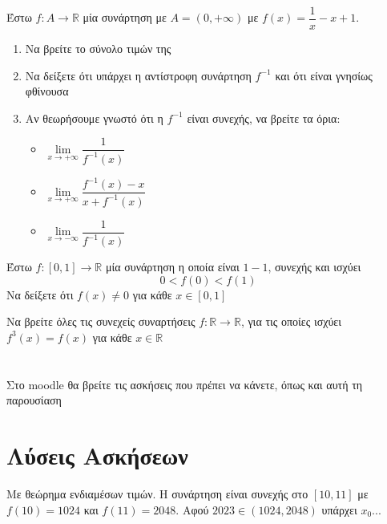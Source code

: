 \documentclass{presentation}
\begin{document}
\begin{askisi}
  Έστω $f:Α\to\mathbb{R}$ μία συνάρτηση με $Α=(0,+\infty)$ με $f(x)=\dfrac{1}{x}-x+1$.
  \begin{enumerate}
    \item<1-> Να βρείτε το σύνολο τιμών της
    \item<2-> Να δείξετε ότι υπάρχει η αντίστροφη συνάρτηση $f^{-1}$ και ότι είναι γνησίως φθίνουσα
    \item<3-> Αν θεωρήσουμε γνωστό ότι η $f^{-1}$ είναι συνεχής, να βρείτε τα όρια:
          \begin{itemize}
            \item $\lim\limits_{x \to +\infty}{ \dfrac{1}{f^{-1}(x)} }$
            \item<4-> $\lim\limits_{x \to +\infty}{ \dfrac{f^{-1}(x)-x}{x+f^{-1}(x)} }$
            \item<5-> $\lim\limits_{x \to -\infty}{ \dfrac{1}{f^{-1}(x)} }$
          \end{itemize}
  \end{enumerate}
\end{askisi}

\begin{askisi}
  Έστω $f:[0,1]\to\mathbb{R}$ μία συνάρτηση η οποία είναι $1-1$, συνεχής και ισχύει
  $$0<f(0)<f(1)$$
  Να δείξετε ότι $f(x)\ne 0$ για κάθε $x\in [0,1]$
\end{askisi}

\begin{askisi}
  Να βρείτε όλες τις συνεχείς συναρτήσεις $f:\mathbb{R}\to\mathbb{R}$, για τις οποίες ισχύει $f^3(x)=f(x)$ για κάθε $x\in\mathbb{R}$
\end{askisi}

\section{}
\begin{frame}
  Στο moodle θα βρείτε τις ασκήσεις που πρέπει να κάνετε, όπως και αυτή τη παρουσίαση
\end{frame}

\appendix
\section{Λύσεις Ασκήσεων}
\begin{frame}
  \tableofcontents
\end{frame}

\begin{lisi}
  Με θεώρημα ενδιαμέσων τιμών. Η συνάρτηση είναι συνεχής στο $[10,11]$ με $f(10)=1024$ και $f(11)=2048$. Αφού $2023\in (1024,2048)$ υπάρχει $x_0$...

  \hyperlink{Άσκηση1}{}
\end{lisi}
\end{document}
